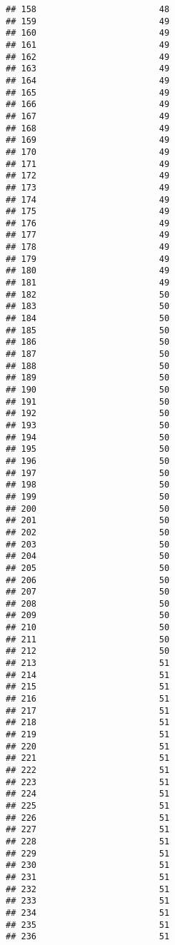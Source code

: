 \documentclass[
]{article}
\begin{document}
\begin{verbatim}
## 158                        48
## 159                        49
## 160                        49
## 161                        49
## 162                        49
## 163                        49
## 164                        49
## 165                        49
## 166                        49
## 167                        49
## 168                        49
## 169                        49
## 170                        49
## 171                        49
## 172                        49
## 173                        49
## 174                        49
## 175                        49
## 176                        49
## 177                        49
## 178                        49
## 179                        49
## 180                        49
## 181                        49
## 182                        50
## 183                        50
## 184                        50
## 185                        50
## 186                        50
## 187                        50
## 188                        50
## 189                        50
## 190                        50
## 191                        50
## 192                        50
## 193                        50
## 194                        50
## 195                        50
## 196                        50
## 197                        50
## 198                        50
## 199                        50
## 200                        50
## 201                        50
## 202                        50
## 203                        50
## 204                        50
## 205                        50
## 206                        50
## 207                        50
## 208                        50
## 209                        50
## 210                        50
## 211                        50
## 212                        50
## 213                        51
## 214                        51
## 215                        51
## 216                        51
## 217                        51
## 218                        51
## 219                        51
## 220                        51
## 221                        51
## 222                        51
## 223                        51
## 224                        51
## 225                        51
## 226                        51
## 227                        51
## 228                        51
## 229                        51
## 230                        51
## 231                        51
## 232                        51
## 233                        51
## 234                        51
## 235                        51
## 236                        51

\end{verbatim}
\end{document}
